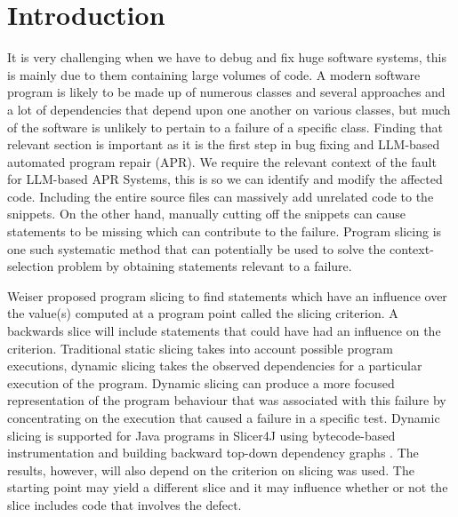 \documentclass[sigconf,nonacm]{acmart}
\begin{document}

\maketitle


\section{Introduction}

It is very challenging when we have to debug and fix huge software systems, this is mainly due to them containing large volumes of code. A modern software program is likely to be made up of numerous classes and several approaches and a lot of dependencies that depend upon one another on various classes, but much of the software is unlikely to pertain to a failure of a specific class. Finding that relevant section is important as it is the first step in bug fixing and LLM-based automated program repair (APR). We require the relevant context of the fault for LLM-based APR Systems, this is so we can identify and modify the affected code. Including the entire source files can massively add unrelated code to the snippets. On the other hand, manually cutting off the snippets can cause statements to be missing which can contribute to the failure. Program slicing is one such systematic method that can potentially be used to solve the context-selection problem by obtaining statements relevant to a failure.

Weiser \cite{Weiser1981ProgramSlicing, Weiser1984ProgramSlicing} proposed program slicing to find statements which have an influence over the value(s) computed at a program point called the slicing criterion. A backwards slice will include statements that could have had an influence on the criterion. Traditional static slicing takes into account possible program executions, dynamic slicing takes the observed dependencies for a particular execution of the program. Dynamic slicing can produce a more focused representation of the program behaviour that was associated with this failure by concentrating on the execution that caused a failure in a specific test. Dynamic slicing is supported for Java programs in Slicer4J using bytecode-based instrumentation and building backward top-down dependency graphs \cite{Ahmed2021Slicer4J}. The results, however, will also depend on the criterion on slicing was used. The starting point may yield a different slice and it may influence whether or not the slice includes code that involves the defect.
\end{document}
